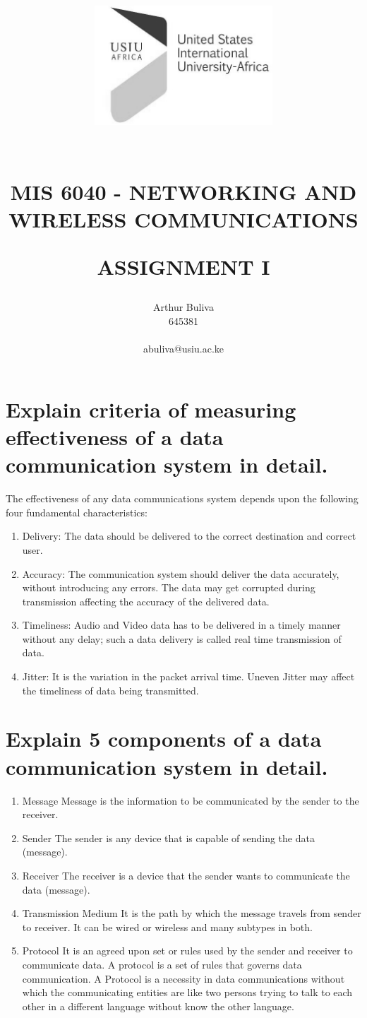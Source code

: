 \documentclass[a4paper,12pt]{report}
\title{
\begin{center}
\begin{normalsize}
 \includegraphics[width=0.5\textwidth]{USIU.png}\\
\textbf{}\end{normalsize}\\
\vspace{1in}
\textbf{MIS 6040 - NETWORKING AND WIRELESS COMMUNICATIONS} \\
\vspace*{\fill}
\author{Arthur Buliva\\645381\\\begin{small}abuliva@usiu.ac.ke\end{small}}
	\begin{footnotesize}
		\textbf{ASSIGNMENT I}
		\vspace{1in}
	\end{footnotesize}
\end{center}
}
\begin{document}
\maketitle

\section*{Explain criteria of measuring effectiveness of a data communication system in detail.}
The effectiveness of any data communications system depends
upon the following four fundamental characteristics:
\begin{enumerate}
\item Delivery: The data should be delivered to the correct
destination and correct user.
\item Accuracy: The communication system should deliver the data
accurately, without introducing any errors. The data may get
corrupted during transmission affecting the accuracy of the
delivered data.
\item Timeliness: Audio and Video data has to be delivered in a
timely manner without any delay; such a data delivery is called
real time transmission of data.
\item Jitter: It is the variation in the packet arrival time. Uneven Jitter
may affect the timeliness of data being transmitted.
\end{enumerate}

\section*{Explain 5 components of a data communication system in detail.}
\begin{enumerate}
\item Message
Message is the information to be communicated by the sender to the receiver.
\item Sender
The sender is any device that is capable of sending the data (message).
\item Receiver
The receiver is a device that the sender wants to communicate the data (message).
\item Transmission Medium
It is the path by which the message travels from sender to receiver. It can be wired or wireless and many subtypes in both.
\item Protocol
It is an agreed upon set or rules used by the sender and receiver to communicate data.
A protocol is a set of rules that governs data communication. A Protocol is a necessity in data communications without which the communicating entities are like two persons trying to talk to each other in a different language without know the other language.
\end{enumerate}
\end{document}
